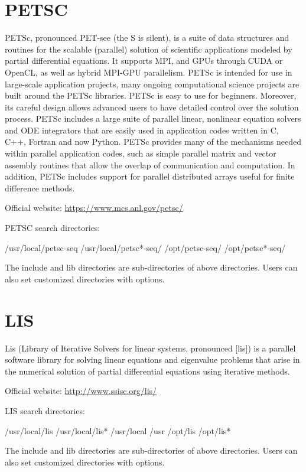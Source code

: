 \documentclass[12pt]{book}
\begin{document}
\section{PETSC}
PETSc, pronounced PET-see (the S is silent), is a suite of data structures and routines for the scalable (parallel) solution of scientific applications modeled by partial differential equations. It supports MPI, and GPUs through CUDA or OpenCL, as well as hybrid MPI-GPU parallelism. PETSc is intended for use in large-scale application projects, many ongoing computational science projects are built around the PETSc libraries. PETSc is easy to use for beginners. Moreover, its careful design allows advanced users to have detailed control over the solution process. PETSc includes a large suite of parallel linear, nonlinear equation solvers and ODE integrators that are easily used in application codes written in C, C++, Fortran and now Python. PETSc provides many of the mechanisms needed within parallel application codes, such as simple parallel matrix and vector assembly routines that allow the overlap of communication and computation. In addition, PETSc includes support for parallel distributed arrays useful for finite difference methods. 

Official website: \url{https://www.mcs.anl.gov/petsc/}

PETSC search directories:
\begin{evb}
/usr/local/petsc-seq
/usr/local/petsc*-seq/
/opt/petsc-seq/
/opt/petsc*-seq/
\end{evb}

The include and lib directories are sub-directories of above directories. Users can also set customized directories with options.

\section{LIS}
Lis (Library of Iterative Solvers for linear systems, pronounced [lis]) is a parallel software library for solving linear equations and eigenvalue problems that arise in the numerical solution of partial differential equations using iterative methods.

Official website: \url{http://www.ssisc.org/lis/}

LIS search directories:
\begin{evb}
/usr/local/lis
/usr/local/lis*
/usr/local
/usr
/opt/lis 
/opt/lis*
\end{evb}

The include and lib directories are sub-directories of above directories. Users can also set customized directories with options.
\end{document}
